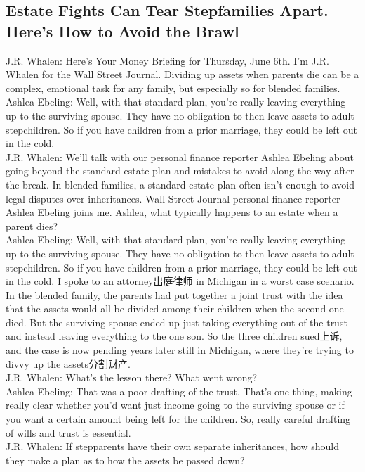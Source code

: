 \documentclass[a4paper,12pt]{article}
\begin{document}
\subsection{Estate Fights Can Tear Stepfamilies Apart. Here's How to Avoid the Brawl}
J.R. Whalen: Here's Your Money Briefing for Thursday, June 6th. I'm J.R. Whalen for the Wall Street Journal. Dividing up assets when parents die can be a complex, emotional task for any family, but especially so for blended families.
\\Ashlea Ebeling: Well, with that standard plan, you're really leaving everything up to the surviving spouse. They have no obligation to then leave assets to adult stepchildren. So if you have children from a prior marriage, they could be left out in the cold.
\\J.R. Whalen: We'll talk with our personal finance reporter Ashlea Ebeling about going beyond the standard estate plan and mistakes to avoid along the way after the break. In blended families, a standard estate plan often isn't enough to avoid legal disputes over inheritances. Wall Street Journal personal finance reporter Ashlea Ebeling joins me. Ashlea, what typically happens to an estate when a parent dies?
\\Ashlea Ebeling: Well, with that standard plan, you're really leaving everything up to the surviving spouse. They have no obligation to then leave assets to adult stepchildren. So if you have children from a prior marriage, they could be left out in the cold. I spoke to an attorney出庭律师 in Michigan in a worst case scenario. In the blended family, the parents had put together a joint trust with the idea that the assets would all be divided among their children when the second one died. But the surviving spouse ended up just taking everything out of the trust and instead leaving everything to the one son. So the three children sued上诉, and the case is now pending years later still in Michigan, where they're trying to divvy up the assets分割财产.
\\J.R. Whalen: What's the lesson there? What went wrong?
\\Ashlea Ebeling: That was a poor drafting of the trust. That's one thing, making really clear whether you'd want just income going to the surviving spouse or if you want a certain amount being left for the children. So, really careful drafting of wills and trust is essential.
\\J.R. Whalen: If stepparents have their own separate inheritances, how should they make a plan as to how the assets be passed down?
\end{document}
